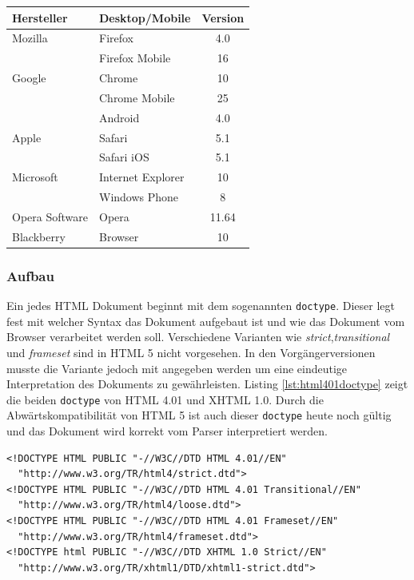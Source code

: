 \vspace{1em}
\begin{center}
  \begin{tabular}{ | l | l | c | }
    \hline
    \textbf{Hersteller} & \textbf{Desktop/Mobile} & \textbf{Version} \\ \hline \hline
    Mozilla & Firefox & 4.0\\
	\hline
	& Firefox Mobile & 16\\
	\hline
	Google & Chrome & 10\\
	\hline
	& Chrome Mobile & 25\\
	\hline
	& Android & 4.0\\
	\hline
	Apple & Safari & 5.1\\
	\hline
	& Safari iOS & 5.1\\
	\hline
	Microsoft & Internet Explorer & 10\\
	\hline
	& Windows Phone & 8\\
	\hline
	Opera Software & Opera & 11.64\\
	\hline
	Blackberry & Browser & 10\\
    \hline
  \end{tabular}
\label{tab:html5browserkomp}
\end{center}

\subsubsection{Aufbau} Ein jedes HTML Dokument beginnt mit dem sogenannten \texttt{doctype}. Dieser legt fest mit welcher Syntax das Dokument aufgebaut ist und wie das Dokument vom Browser verarbeitet werden soll. Verschiedene Varianten wie \textit{strict},\textit{transitional} und \textit{frameset} sind in HTML 5 nicht vorgesehen. In den Vorgängerversionen musste die Variante jedoch mit angegeben werden um eine eindeutige Interpretation des Dokuments zu gewährleisten. Listing \ref{lst:html401doctype} zeigt die beiden \texttt{doctype} von HTML 4.01 und XHTML 1.0. Durch die Abwärtskompatibilität von HTML 5 ist auch dieser \texttt{doctype} heute noch gültig und das Dokument wird korrekt vom Parser interpretiert werden.
    
\vspace{1em}
\begin{lstlisting}[language=HTML5, caption=(X)HTML4.01 \texttt{doctype}-Element, label=lst:html401doctype]
<!DOCTYPE HTML PUBLIC "-//W3C//DTD HTML 4.01//EN"
  "http://www.w3.org/TR/html4/strict.dtd">
<!DOCTYPE HTML PUBLIC "-//W3C//DTD HTML 4.01 Transitional//EN"
  "http://www.w3.org/TR/html4/loose.dtd">
<!DOCTYPE HTML PUBLIC "-//W3C//DTD HTML 4.01 Frameset//EN"
  "http://www.w3.org/TR/html4/frameset.dtd">        
<!DOCTYPE html PUBLIC "-//W3C//DTD XHTML 1.0 Strict//EN"
  "http://www.w3.org/TR/xhtml1/DTD/xhtml1-strict.dtd">    
\end{lstlisting}
	
